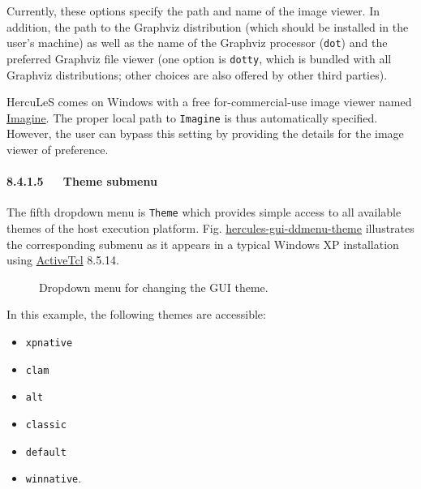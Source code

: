 \documentclass[a4paper]{article}
\begin{document}
Currently, these options specify the path and name of the image viewer. In addition, the path to the Graphviz distribution (which should be installed in the user's machine) as well as the name of the Graphviz processor (\texttt{dot}) and the preferred Graphviz file viewer (one option is \texttt{dotty}, which is bundled with all Graphviz distributions; other choices are also offered by other third parties).

HercuLeS comes on Windows with a free for-commercial-use image viewer named \href{http://www.nyam.pe.kr/}{Imagine}. The proper local path to \texttt{Imagine} is thus automatically specified. However, the user can bypass this setting by providing the details for the image viewer of preference.


\paragraph{8.4.1.5~~~Theme submenu%
  \label{theme-submenu}%
}

The fifth dropdown menu is \texttt{Theme} which provides simple access to all available themes of the host execution platform. Fig. \hyperref[hercules-gui-ddmenu-theme]{hercules-gui-ddmenu-theme} illustrates the corresponding submenu as it appears in a typical Windows XP installation using \href{http://www.activestate.com/activetcl}{ActiveTcl} 8.5.14.
\begin{figure}
\label{hercules-gui-ddmenu-theme}
\noindent{}
\caption{Dropdown menu for changing the GUI theme.}
\end{figure}

In this example, the following themes are accessible:
%
\begin{itemize}

\item \texttt{xpnative}

\item \texttt{clam}

\item \texttt{alt}

\item \texttt{classic}

\item \texttt{default}

\item \texttt{winnative}.

\end{itemize}
\end{document}
